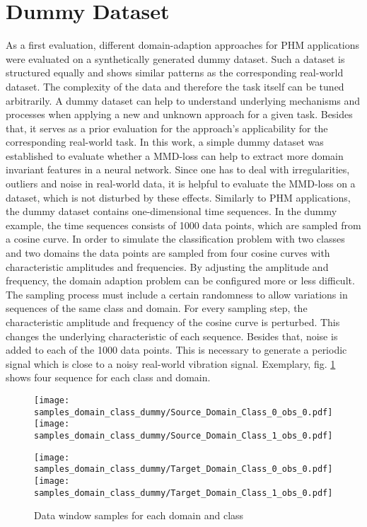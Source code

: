 \section{Dummy Dataset}
As a first evaluation, different domain-adaption approaches for PHM applications were evaluated on a synthetically generated dummy dataset. Such a dataset is structured equally and shows similar patterns as the corresponding real-world dataset. The complexity of the data and therefore the task itself can be tuned arbitrarily. A dummy dataset can help to understand underlying mechanisms and processes when applying a new and unknown approach for a given task. Besides that, it serves as a prior evaluation for the approach's applicability for the corresponding real-world task. In this work, a simple dummy dataset was established to evaluate whether a MMD-loss can help to extract more domain invariant features in a neural network. Since one has to deal with irregularities, outliers and noise in real-world data, it is helpful to evaluate the MMD-loss on a dataset, which is not disturbed by these effects. Similarly to PHM applications, the dummy dataset contains one-dimensional time sequences. In the dummy example, the time sequences consists of 1000 data points, which are sampled from a cosine curve. In order to simulate the classification problem with two classes and two domains the data points are sampled from four cosine curves with characteristic amplitudes and frequencies. By adjusting the amplitude and frequency, the domain adaption problem can be configured more or less difficult. The sampling process must include a certain randomness to allow variations in sequences of the same class and domain. For every sampling step, the characteristic amplitude and frequency of the cosine curve is perturbed. This changes the underlying characteristic of each sequence. Besides that, noise is added to each of the 1000 data points. This is necessary to generate a periodic signal which is close to a noisy real-world vibration signal. Exemplary, fig. \ref{fig:samples_domain_class_dummy} shows four sequence for each class and domain. 

\begin{figure}[H]
  \centering
  \texttt{[image: samples\_domain\_class\_dummy/Source\_Domain\_Class\_0\_obs\_0.pdf]}
  \hspace{.3cm}
  \texttt{[image: samples\_domain\_class\_dummy/Source\_Domain\_Class\_1\_obs\_0.pdf]}

  \vspace{.3cm}

  \texttt{[image: samples\_domain\_class\_dummy/Target\_Domain\_Class\_0\_obs\_0.pdf]}
  \hspace{.3cm}
  \texttt{[image: samples\_domain\_class\_dummy/Target\_Domain\_Class\_1\_obs\_0.pdf]}

  \caption{Data window samples for each domain and class}
  \label{fig:samples_domain_class_dummy}
\end{figure}

